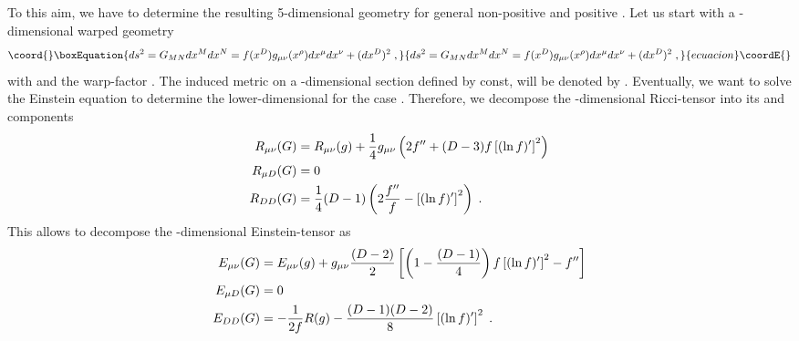 \documentclass[a4paper,12pt]{article}
\begin{document}
To this aim, we have to determine the resulting 5-dimensional geometry for
general non-positive \coordHE{} and positive \coordHE{}.
Let us start with a \coordHE{}-dimensional warped geometry
\begin{equation}\coord{}\boxEquation{
  ds^2=G_{MN}dx^M dx^N=f(x^D)g_{\mu\nu}(x^\rho)dx^\mu dx^\nu + (dx^D)^2 \; ,
}{
  ds^2=G_{MN}dx^M dx^N=f(x^D)g_{\mu\nu}(x^\rho)dx^\mu dx^\nu + (dx^D)^2 \; ,
}{ecuacion}\coordE{}\end{equation}
with \coordHE{} and the warp-factor
\coordHE{}. The induced metric on a \coordHE{}-dimensional section defined by
\coordHE{} const, will be denoted by \coordHE{}. Eventually, we want to solve the Einstein equation
to determine the lower-dimensional \coordHE{}
for the case \coordHE{}. Therefore, we decompose the \coordHE{}-dimensional Ricci-tensor
\coordHE{} into its \myHighlight{$\mu$}\coordHE{} and \coordHE{} components
\begin{alignat}{3}
  R_{\mu\nu}(G) &= R_{\mu\nu}(g)+\frac{1}{4}g_{\mu\nu}
            \left( 2f^{\prime\prime}+(D-3)f\left[(\ln f)^\prime\right]^2 
            \right) \notag \\
  R_{\mu D}(G) &= 0 \\
  R_{DD}(G) &= \frac{1}{4}(D-1)\left( 2\frac{f^{\prime\prime}}{f}
                                    - \left[(\ln f)^\prime\right]^2
                               \right) \; . \notag                                   
\end{alignat}
This allows to decompose the \coordHE{}-dimensional Einstein-tensor
\coordHE{} as
\begin{alignat}{3}
  E_{\mu\nu}(G) &= E_{\mu\nu}(g)+g_{\mu\nu}\frac{(D-2)}{2}
                   \left[ \left(1-\frac{(D-1)}{4}\right) 
                          f\left[(\ln f)^\prime\right]^2
                         -f^{\prime\prime}
                   \right] \notag \\
  E_{\mu D}(G) &= 0 \\
  E_{DD}(G) &= -\frac{1}{2f}R(g)
               -\frac{(D-1)(D-2)}{8}
                \left[(\ln f)^\prime\right]^2 \; . \notag
\end{alignat}
\end{document}
